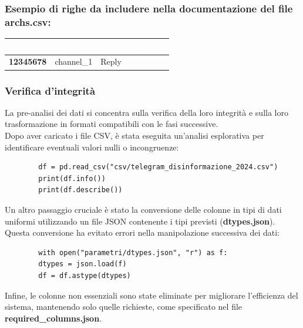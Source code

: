 \documentclass[12pt]{article}
\begin{document}
	\subsubsection{Esempio di righe da includere nella documentazione del file archs.csv:}
	\begin{tabular}{|p{5cm}|p{4cm}|p{4cm}|}
		\hline
		\cellcolor{darkblue}\textcolor{white}{\textbf{Source}} & 
		\cellcolor{darkblue}\textcolor{white}{\textbf{Target}} & 
		\cellcolor{darkblue}\textcolor{white}{\textbf{Another Target}} \\
		\hline
		\textbf{12345678} & channel\_1 & Reply \\
		\hline
	\end{tabular}
	\subsubsection{Verifica d'integrità}
	La pre-analisi dei dati si concentra sulla verifica della loro integrità e sulla loro trasformazione in formati compatibili con le fasi successive.\\
	Dopo aver caricato i file CSV, è stata eseguita un'analisi esplorativa per identificare eventuali valori nulli o incongruenze:
	\begin{lstlisting}
		df = pd.read_csv("csv/telegram_disinformazione_2024.csv")
		print(df.info())
		print(df.describe())
	\end{lstlisting}
	Un altro passaggio cruciale è stato la conversione delle colonne in tipi di dati uniformi utilizzando un file JSON contenente i tipi previsti (\textbf{dtypes.json}).\\
	Questa conversione ha evitato errori nella manipolazione successiva dei dati:
	\begin{lstlisting}
		with open("parametri/dtypes.json", "r") as f:
		dtypes = json.load(f)
		df = df.astype(dtypes)
	\end{lstlisting}
	Infine, le colonne non essenziali sono state eliminate per migliorare l'efficienza del sistema, mantenendo solo quelle richieste, come specificato nel file \textbf{required\_columns.json}.
\end{document}
